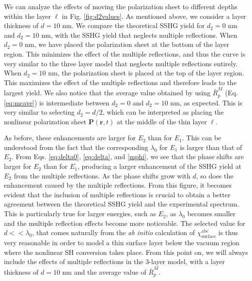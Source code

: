 We can analyze the effects of moving the polarization sheet to different depths
within the layer $\ell$ in Fig. \ref{fig:d2values}. As mentioned above, we
consider a layer thickness of $d = 10$ nm. We compare the theoretical SSHG yield
for $d_{2} = 0$ nm and $d_{2} = 10$ nm, with the SSHG yield that neglects
multiple reflections. When $d_{2} = 0$ nm, we have placed the polarization sheet
at the bottom of the layer region. This minimizes the effect of the multiple
reflections, and thus the curve is very similar to the three layer model that
neglects multiple reflections entirely. When $d_{2} = 10$ nm, the polarization
sheet is placed at the top of the layer region. This maximizes the effect of the
multiple reflections and therefore leads to the largest yield. We also notice
that the average value obtained by using $\bar{R}^{M}_{p}$ (Eq.
\eqref{eq:mcave}) is intermediate between $d_{2} = 0$ and $d_{2} = 10$ nm, as
expected. This is very similar to selecting $d_{2} = d/2$, which can be
interpreted as placing the nonlinear polarization sheet
$\mathbf{P}(\mathbf{r},t)$ at the middle of the thin layer $\ell$.

As before, these enhancements are larger for $E_{2}$ than for $E_{1}$. This can
be understood from the fact that the corresponding $\lambda_{0}$ for $E_{1}$ is
larger than that of $E_{2}$. From Eqs. \eqref{eq:delta0}, \eqref{eq:delta}, and
\eqref{mphi}, we see that the phase shifts are larger for $E_{2}$ than for
$E_{1}$, producing a larger enhancement of the SSHG yield at $E_{2}$ from the
multiple reflections. As the phase shifts grow with $d$, so does the enhancement
caused by the multiple reflections. From this figure, it becomes evident that
the inclusion of multiple reflections is crucial to obtain a better agreement
between the theoretical SSHG yield and the experimental spectrum. This is
particularly true for larger energies, such as $E_{2}$, as $\lambda_{0}$ becomes
smaller and the multiple reflection effects become more noticeable. The selected
value for $d << \lambda_{0}$, that comes naturally from the \emph{ab initio}
calculation of $\chi^{\mathrm{abc}}_{\mathrm{surface}}$ is thus very reasonable
in order to model a thin surface layer below the vacuum region where the
nonlinear SH conversion takes place. From this point on, we will always include
the effects of multiple reflections in the 3-layer model, with a layer thickness
of $d = 10$ nm and the average value of $\bar{R}^{M}_{p}$.

